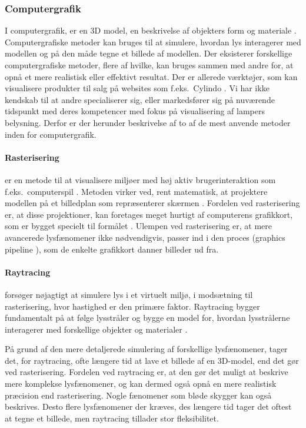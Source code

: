 \subsubsection{Computergrafik}
\label{sec:computergrafik}
I computergrafik, er en 3D model, en beskrivelse af objekters form og materiale \cite{computergrafik_introduktion}. Computergrafiske metoder kan bruges til at simulere, hvordan lys interagerer med modellen og på den måde tegne et billede af modellen. Der eksisterer forskellige computergrafiske metoder, flere af hvilke, kan bruges sammen med andre for, at opnå et mere realistisk eller effektivt resultat. Der er allerede værktøjer, som kan visualisere produkter til salg på websites som f.eks.\ Cylindo \cite{Cylindo}. Vi har ikke kendskab til at andre specialiserer sig, eller markedsfører sig på nuværende tidspunkt med deres kompetencer med fokus på visualisering af lampers belysning. Derfor er der herunder beskrivelse af to af de mest anvende metoder inden for computergrafik.

\paragraph{Rasterisering}
er en metode til at visualisere miljøer med høj aktiv brugerinteraktion som f.eks.\ computerspil \cite{rastarization}. Metoden virker ved, rent matematisk, at projektere modellen på et billedplan som repræsenterer skærmen \cite{rastarization}. Fordelen ved rasterisering er, at disse projektioner, kan foretages meget hurtigt af computerens grafikkort, som er bygget specielt til formålet \cite{rastarization}. Ulempen ved rasterisering er, at mere avancerede lysfænomener ikke nødvendigvis, passer ind i den proces (graphics pipeline \cite{rastarization}), som de enkelte grafikkort danner billeder ud fra. 

\paragraph{Raytracing} forsøger nøjagtigt at simulere lys i et virtuelt miljø, i modsætning til rasterisering, hvor hastighed er den primære faktor. Raytracing bygger fundamentalt på at følge lysstråler og bygge en model for, hvordan lysstrålerne interagerer med forskellige objekter og materialer \cite{raytracing_for_begyndere}. 

På grund af den mere detaljerede simulering af forskellige lysfænomener, tager det, for raytracing, ofte længere tid at lave et billede af en 3D-model, end det gør ved rasterisering. Fordelen ved raytracing er, at den gør det muligt at beskrive mere komplekse lysfænomener, og kan dermed også opnå en mere realistisk præcision end rasterisering. Nogle fænomener som bløde skygger kan også beskrives. Desto flere lysfænomener der kræves, des længere tid tager det oftest at tegne et billede, men raytracing tillader stor fleksibilitet.